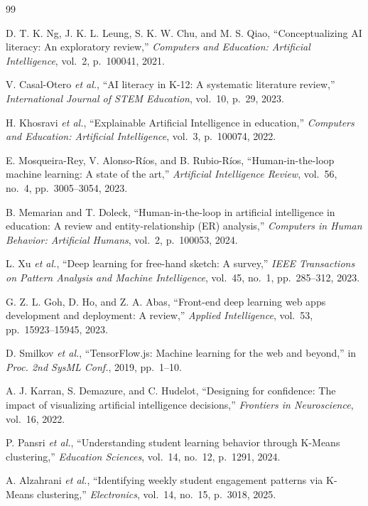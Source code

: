 \begin{thebibliography}{99}

D. T. K. Ng, J. K. L. Leung, S. K. W. Chu, and M. S. Qiao, ``Conceptualizing AI literacy: An exploratory review,'' \textit{Computers and Education: Artificial Intelligence}, vol.~2, p.~100041, 2021.

V. Casal-Otero \textit{et al.}, ``AI literacy in K-12: A systematic literature review,'' \textit{International Journal of STEM Education}, vol.~10, p.~29, 2023.

H. Khosravi \textit{et al.}, ``Explainable Artificial Intelligence in education,'' \textit{Computers and Education: Artificial Intelligence}, vol.~3, p.~100074, 2022.

E. Mosqueira-Rey, V. Alonso-R\'ios, and B. Rubio-R\'ios, ``Human-in-the-loop machine learning: A state of the art,'' \textit{Artificial Intelligence Review}, vol.~56, no.~4, pp.~3005--3054, 2023.

B. Memarian and T. Doleck, ``Human-in-the-loop in artificial intelligence in education: A review and entity-relationship (ER) analysis,'' \textit{Computers in Human Behavior: Artificial Humans}, vol.~2, p.~100053, 2024.

L. Xu \textit{et al.}, ``Deep learning for free-hand sketch: A survey,'' \textit{IEEE Transactions on Pattern Analysis and Machine Intelligence}, vol.~45, no.~1, pp.~285--312, 2023.

G. Z. L. Goh, D. Ho, and Z. A. Abas, ``Front-end deep learning web apps development and deployment: A review,'' \textit{Applied Intelligence}, vol.~53, pp.~15923--15945, 2023.

D. Smilkov \textit{et al.}, ``TensorFlow.js: Machine learning for the web and beyond,'' in \textit{Proc. 2nd SysML Conf.}, 2019, pp.~1--10.

A. J. Karran, S. Demazure, and C. Hudelot, ``Designing for confidence: The impact of visualizing artificial intelligence decisions,'' \textit{Frontiers in Neuroscience}, vol.~16, 2022.

P. Pansri \textit{et al.}, ``Understanding student learning behavior through K-Means clustering,'' \textit{Education Sciences}, vol.~14, no.~12, p.~1291, 2024.

A. Alzahrani \textit{et al.}, ``Identifying weekly student engagement patterns via K-Means clustering,'' \textit{Electronics}, vol.~14, no.~15, p.~3018, 2025.


\end{thebibliography}
